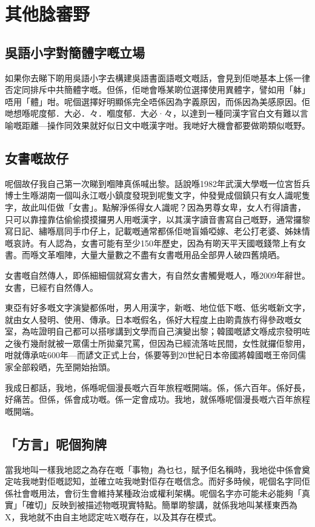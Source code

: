 \chapter{其他腍審野}


\section{吳語小字對簡體字嘅立場}
如果你去睇下啲用吳語小字去構建吳語書面語嘅文嘅話，會見到佢哋基本上係一律否定同排斥中共簡體字嘅。但係，佢哋會喺某啲位選擇使用異體字，譬如用「躰」唔用「體」咁。呢個選擇好明顯係完全唔係因為字義原因，而係因為美感原因。佢哋想喺呢度郁．大必．々．嗰度郁．大必·々，以達到一種同漢字官白文有難以言喻嘅距離—操作同效果就好似日文中嘅漢字咁。我哋好大機會都要做啲類似嘅野。



\section{女書嘅故仔}
呢個故仔我自己第一次睇到嗰陣真係喊出黎。話說喺1982年武漢大學嘅一位宮哲兵博士生喺湖南一個叫永江嘅小鎮度發現到呢隻文字，仲發覺成個鎮只有女人識呢隻字，故此叫佢做「女書」。點解淨係得女人識呢？因為男尊女卑，女人冇得讀書，只可以靠撞靠估偷偷摸摸攞男人用嘅漢字，以其漢字讀音書寫自己嘅野，通常攞黎寫日記、繡喺扇同手巾仔上，記載嘅通常都係佢哋盲婚啞嫁、老公打老婆、姊妹情嘅哀詩。有人認為，女書可能有至少150年歷史，因為有啲天平天國嘅錢幣上有女書。而喺文革嗰陣，大量大量數之不盡有女書嘅用品全部畀人破四舊燒晒。

女書嘅自然傳人，即係細細個就寫女書大，有自然女書觸覺嘅人，喺2009年辭世。女書，已經冇自然傳人。


東亞有好多嘅文字演變都係咁，男人用漢字，新嘅、地位低下嘅、低劣嘅新文字，就由女人發明、使用、傳承。日本嘅假名，係好大程度上由啲貴族冇得參政嘅女室，為咗證明自己都可以搭嗲講到文學而自己演變出黎；韓國嘅諺文喺成宗發明咗之後冇幾耐就被一眾儒士所拋棄咒罵，但因為已經流落咗民間，女性就攞佢黎用，咁就傳承咗600年—而諺文正式上台，係要等到20世紀日本帝國將韓國嘅王帝同儒家全部殺晒，先至開始抬頭。

我成日都話，我地，係喺呢個漫長嘅六百年旅程嘅開端。係，係六百年。係好長，好痛苦。但係，係會成功嘅。係一定會成功。我地，就係喺呢個漫長嘅六百年旅程嘅開端。



\section{「方言」呢個狗牌}
當我地叫一樣我地認之為存在嘅「事物」為乜乜，賦予佢名稱時，我地從中係會奠定咗我哋對佢嘅認知，並確立咗我哋對佢存在嘅信念。而好多時候，呢個名字同佢係社會嘅用法，會衍生會維持某種政治或權利架構。呢個名字亦可能未必能夠「真實」「確切」反映到被描述物嘅現實特點。簡單啲黎講，就係我地叫某樣東西為X，我地就不由自主地認定咗X嘅存在，以及其存在模式。

